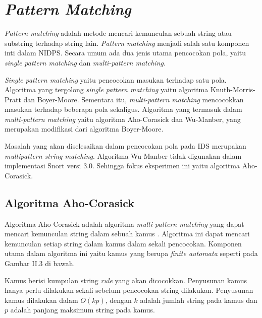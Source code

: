 
\section{\emph{Pattern Matching}}

  \emph{Pattern matching} adalah metode mencari kemunculan sebuah string atau substring terhadap string lain. \emph{Pattern matching} menjadi salah satu komponen inti dalam NIDPS. Secara umum ada dua jenis utama pencocokan pola, yaitu \emph{single pattern matching} dan \emph{multi-pattern matching}. 
  
  \emph{Single pattern matching} yaitu pencocokan masukan terhadap satu pola. Algoritma yang tergolong \emph{single pattern matching} yaitu algoritma Knuth-Morris-Pratt dan Boyer-Moore. Sementara itu, \emph{multi-pattern matching} mencocokkan masukan terhadap beberapa pola sekaligus. Algoritma yang termasuk dalam \emph{multi-pattern matching} yaitu algoritma Aho-Corasick dan Wu-Manber, yang merupakan modifikasi dari algoritma Boyer-Moore. 
  
  Masalah yang akan diselesaikan dalam pencocokan pola pada IDS merupakan \emph{multipattern string matching}. Algoritma Wu-Manber tidak digunakan dalam implementasi Snort versi 3.0. Sehingga fokus eksperimen ini yaitu algoritma Aho-Corasick.


  \subsection{Algoritma Aho-Corasick}

    Algoritma Aho-Corasick adalah algoritma \emph{multi-pattern matching} yang dapat mencari kemunculan string dalam sebuah kamus \citep{ahoc1975}. Algoritma ini dapat mencari kemunculan setiap string dalam kamus dalam sekali pencocokan. Komponen utama dalam algoritma ini yaitu kamus yang berupa \emph{finite automata} seperti pada Gambar II.3 di bawah. %

    Kamus berisi kumpulan string \emph{rule} yang akan dicocokkan. Penyusunan kamus hanya perlu dilakukan sekali sebelum pencocokan string dilakukan. Penyusunan kamus dilakukan dalam $O(kp)$, dengan $k$ adalah jumlah string pada kamus dan $p$ adalah panjang maksimum string pada kamus.

